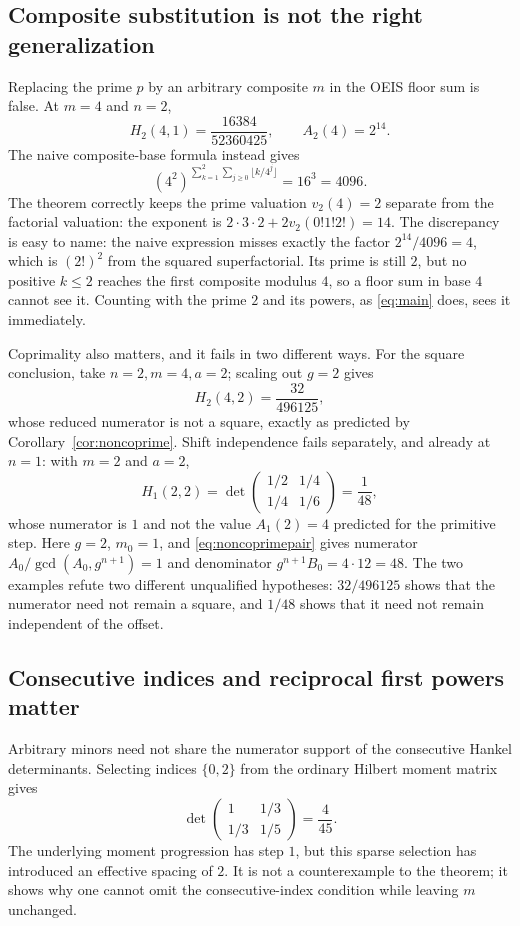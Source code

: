 \documentclass[11pt,a4paper]{article}
\numberwithin{equation}{section}
\theoremstyle{definition}
\theoremstyle{remark}
\begin{document}
\subsection{Composite substitution is not the right generalization}
Replacing the prime $p$ by an arbitrary composite $m$ in the OEIS floor sum is false. At $m=4$ and $n=2$,
\[
 H_2(4,1)=\frac{16384}{52360425},\qquad A_2(4)=2^{14}.
\]
The naive composite-base formula instead gives
\[
 (4^2)^{\sum_{k=1}^2\sum_{j\geq0}\lfloor k/4^j\rfloor}
 =16^3=4096.
\]
The theorem correctly keeps the prime valuation $v_2(4)=2$ separate from the factorial valuation: the exponent is $2\cdot3\cdot2+2v_2(0!1!2!)=14$. The discrepancy is easy to name: the naive expression misses exactly the factor $2^{14}/4096=4$, which is $(2!)^2$ from the squared superfactorial. Its prime is still $2$, but no positive $k\leq2$ reaches the first composite modulus $4$, so a floor sum in base $4$ cannot see it. Counting with the prime $2$ and its powers, as \eqref{eq:main} does, sees it immediately.

Coprimality also matters, and it fails in two different ways. For the square conclusion, take $n=2,m=4,a=2$; scaling out $g=2$ gives
\[
 H_2(4,2)=\frac{32}{496125},
\]
whose reduced numerator is not a square, exactly as predicted by Corollary~\ref{cor:noncoprime}. Shift independence fails separately, and already at $n=1$: with $m=2$ and $a=2$,
\[
 H_1(2,2)=\det\begin{pmatrix}1/2&1/4\\1/4&1/6\end{pmatrix}=\frac1{48},
\]
whose numerator is $1$ and not the value $A_1(2)=4$ predicted for the primitive step. Here $g=2$, $m_0=1$, and \eqref{eq:noncoprimepair} gives numerator $A_0/\gcd(A_0,g^{n+1})=1$ and denominator $g^{n+1}B_0=4\cdot12=48$. The two examples refute two different unqualified hypotheses: $32/496125$ shows that the numerator need not remain a square, and $1/48$ shows that it need not remain independent of the offset.

\subsection{Consecutive indices and reciprocal first powers matter}
Arbitrary minors need not share the numerator support of the consecutive Hankel determinants. Selecting indices $\{0,2\}$ from the ordinary Hilbert moment matrix gives
\[
 \det\begin{pmatrix}1&1/3\\1/3&1/5\end{pmatrix}=\frac4{45}.
\]
The underlying moment progression has step $1$, but this sparse selection has introduced an effective spacing of $2$. It is not a counterexample to the theorem; it shows why one cannot omit the consecutive-index condition while leaving $m$ unchanged.
\end{document}
